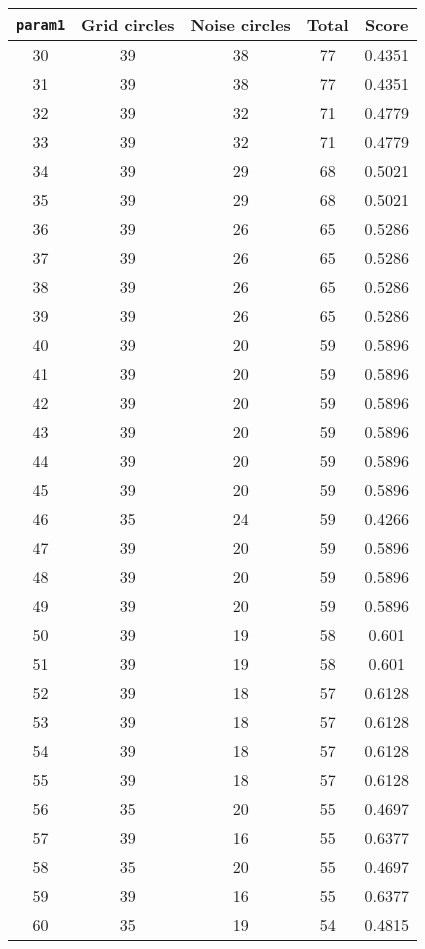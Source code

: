 \documentclass[letterpaper, 12pt]{article}
\begin{document}
\begin{longtable}{|c|c|c|c|c|}
\hline
\textbf{\texttt{param1}} & \textbf{Grid circles} & \textbf{Noise circles} & \textbf{Total} & \textbf{Score} \\
\hline
30 & 39 & 38 & 77 & 0.4351 \\
\hline
31 & 39 & 38 & 77 & 0.4351 \\
\hline
32 & 39 & 32 & 71 & 0.4779 \\
\hline
33 & 39 & 32 & 71 & 0.4779 \\
\hline
34 & 39 & 29 & 68 & 0.5021 \\
\hline
35 & 39 & 29 & 68 & 0.5021 \\
\hline
36 & 39 & 26 & 65 & 0.5286 \\
\hline
37 & 39 & 26 & 65 & 0.5286 \\
\hline
38 & 39 & 26 & 65 & 0.5286 \\
\hline
39 & 39 & 26 & 65 & 0.5286 \\
\hline
40 & 39 & 20 & 59 & 0.5896 \\
\hline
41 & 39 & 20 & 59 & 0.5896 \\
\hline
42 & 39 & 20 & 59 & 0.5896 \\
\hline
43 & 39 & 20 & 59 & 0.5896 \\
\hline
44 & 39 & 20 & 59 & 0.5896 \\
\hline
45 & 39 & 20 & 59 & 0.5896 \\
\hline
46 & 35 & 24 & 59 & 0.4266 \\
\hline
47 & 39 & 20 & 59 & 0.5896 \\
\hline
48 & 39 & 20 & 59 & 0.5896 \\
\hline
49 & 39 & 20 & 59 & 0.5896 \\
\hline
50 & 39 & 19 & 58 & 0.601 \\
\hline
51 & 39 & 19 & 58 & 0.601 \\
\hline
52 & 39 & 18 & 57 & 0.6128 \\
\hline
53 & 39 & 18 & 57 & 0.6128 \\
\hline
54 & 39 & 18 & 57 & 0.6128 \\
\hline
55 & 39 & 18 & 57 & 0.6128 \\
\hline
56 & 35 & 20 & 55 & 0.4697 \\
\hline
57 & 39 & 16 & 55 & 0.6377 \\
\hline
58 & 35 & 20 & 55 & 0.4697 \\
\hline
59 & 39 & 16 & 55 & 0.6377 \\
\hline
60 & 35 & 19 & 54 & 0.4815 \\

\end{longtable}
\end{document}
